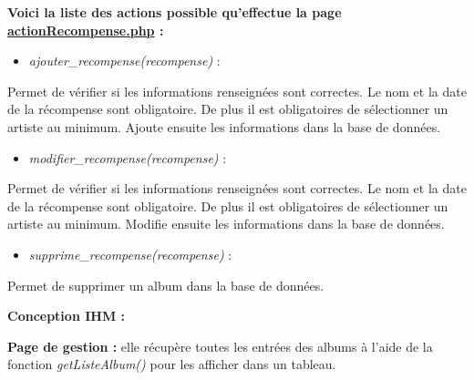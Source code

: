 			\begin{paragraphe}
                \textbf{Voici la liste des actions possible qu'effectue la page \underline{actionRecompense.php} :}
            
                \begin{itemize}
                    \item \emph{ajouter\_recompense(recompense)} :
                \end{itemize}
                \begin{paragraphe}
                    Permet de vérifier si les informations renseignées sont correctes. Le nom et la date de la récompense sont obligatoire. De plus il est obligatoires de sélectionner un artiste au minimum. Ajoute ensuite les informations dans la base de données.
                \end{paragraphe}
                
                \begin{itemize}
                    \item \emph{modifier\_recompense(recompense)} :
                \end{itemize}
                \begin{paragraphe}
                    Permet de vérifier si les informations renseignées sont correctes. Le nom et la date de la récompense sont obligatoire. De plus il est obligatoires de sélectionner un artiste au minimum. Modifie ensuite les informations dans la base de données.
                \end{paragraphe}
                
                \begin{itemize}
                    \item \emph{supprime\_recompense(recompense)} :
                \end{itemize}
                \begin{paragraphe}
                    Permet de supprimer un album dans la base de données.
                \end{paragraphe}
            \end{paragraphe}

			\begin{paragraphe}
				\textbf{Conception IHM :}
			\end{paragraphe}
            
            \begin{paragraphe}
                \textbf{Page de gestion :} elle récupère toutes les entrées des albums à l'aide de la fonction \emph{getListeAlbum()} pour les afficher dans un tableau.
            \end{paragraphe}

